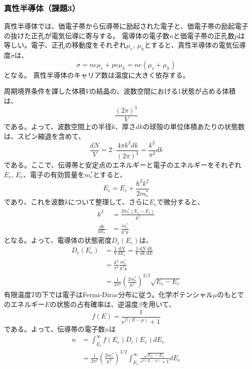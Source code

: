 \documentclass[11pt, titlepage, openany]{ltjsbook}
\begin{document}
\subsubsection{真性半導体（課題3）}
真性半導体では、価電子帯から伝導帯に励起された電子と、価電子帯の励起電子の抜けた正孔が電気伝導に寄与する。
電導体の電子数$n$と価電子帯の正孔数$p$は等しい。電子、正孔の移動度をそれぞれ$\mu_e,\, \mu_h$とすると、真性半導体の電気伝導度$\sigma$は、
\begin{equation}
  \sigma = n e \mu_e + p e \mu_h = ne (\mu_e + \mu_h)
  \label{sigma}
\end{equation}
となる。
真性半導体のキャリア数は温度に大きく依存する。\par
周期境界条件を課した体積$V$の結晶の、波数空間における1状態が占める体積は、
\begin{equation}
  \frac{(2\pi)^3}{V}
\end{equation}
である。よって、波数空間上の半径$k$、厚さ$dk$の球殻の単位体積あたりの状態数は、スピン縮退を含めて、
\begin{equation}
  \frac{dN}{V} = 2 \cdot \frac{4\pi k^2 dk}{(2\pi)^3} = \frac{k^2}{\pi^2}dk
\end{equation}
である。ここで、伝導帯と安定点のエネルギーと電子のエネルギーをそれぞれ$E_c,\, E_e$、電子の有効質量を$m_e^*$とすると、
\begin{equation}
  E_e = E_c + \frac{\hbar^2 k^2}{2m_e^*}
\end{equation}
であり、これを波数$k$について整理して、さらに$E_e$で微分すると、
\begin{align}
  k^2 & = \frac{2m_e^* (E_e - E_c)}{\hbar^2} \\
  \frac{dk}{dE_e} & = \frac{m_e^*}{\hbar^2 k}
\end{align}
となる。よって、電導体の状態密度$D_c(E_e)$は、
\begin{align}
  D_c(E_e) & = \frac{1}{V} \frac{dN}{dE_e} = \frac{1}{V} \frac{dN}{dk} \frac{dk}{dE} \\
  & = \frac{k^2}{\pi^2} \frac{m_e^*}{\hbar^2 k} \\
  & = \frac{1}{2\pi^2} \left( \frac{2m_e^*}{\hbar^2} \right)^{3/2} \sqrt{E_e - E_c}
\end{align}
有限温度$T$の下では電子はFermi-Dirac分布に従う。化学ポテンシャル$\mu$のもとでのエネルギー$E$の状態の占有確率は、逆温度$\beta$を用いて、
\begin{equation}
  f(E) = \frac{1}{e^{\beta(E-\mu)} + 1}
\end{equation}
である。よって、伝導帯の電子数$n$は
\begin{align}
  n & = \int_{E_c}^{\infty} f(E_e) D_c(E_e) dE_e \\
  & = \frac{1}{2\pi^2} \left( \frac{2m_e^*}{\hbar^2} \right)^{3/2} \int_{E_c}^{\infty} \frac{\sqrt{E_e - E_c}}{e^{\beta(E_e-\mu)} + 1} dE_e
\end{align}
\end{document}

